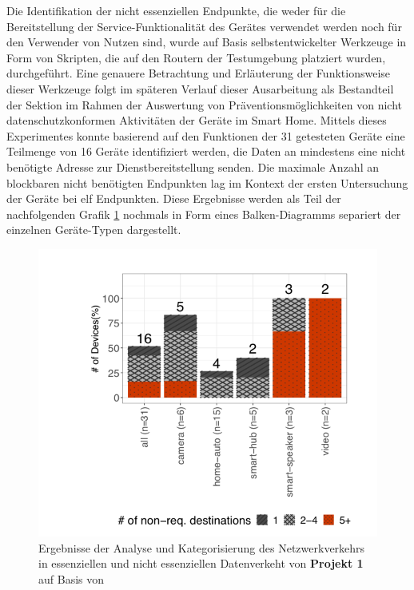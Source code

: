 \noindent Die Identifikation der nicht essenziellen Endpunkte, die weder für die Bereitstellung der Service-Funktionalität des Gerätes verwendet werden noch für den Verwender von Nutzen sind, wurde auf Basis selbstentwickelter Werkzeuge in Form von Skripten, die auf den Routern der Testumgebung platziert wurden, durchgeführt. Eine genauere Betrachtung und Erläuterung der Funktionsweise dieser Werkzeuge folgt im späteren Verlauf dieser Ausarbeitung als Bestandteil der Sektion  im Rahmen der Auswertung von Präventionsmöglichkeiten von nicht datenschutzkonformen Aktivitäten der Geräte im Smart Home.
Mittels dieses Experimentes konnte basierend auf den Funktionen der 31 getesteten Geräte eine Teilmenge von 16 Geräte identifiziert werden, die Daten an mindestens eine nicht benötigte Adresse zur Dienstbereitstellung senden. Die maximale Anzahl an blockbaren nicht benötigten Endpunkten lag im Kontext der ersten Untersuchung der Geräte bei elf Endpunkten. Diese Ergebnisse werden als Teil der nachfolgenden Grafik \ref{fig:result-non-req-dest} nochmals in Form eines Balken-Diagramms separiert der einzelnen Geräte-Typen dargestellt.
\begin{figure}
    \centering
    \includegraphics[scale=0.3]{main/pictures/projekt_one/Non_Required_Traffic}
    \caption{Ergebnisse der Analyse und Kategorisierung des Netzwerkverkehrs in essenziellen und nicht essenziellen Datenverkeht von \textbf{Projekt 1} auf Basis von \cite{Mandalari2021}}
    \label{fig:result-non-req-dest}
\end{figure}

